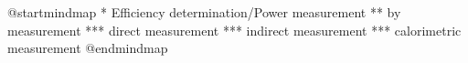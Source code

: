 \documentclass{scrartcl}
\begin{document}
\begin{plantuml}
@startmindmap
* Efficiency determination/\n Power measurement
** by measurement
*** direct measurement
*** indirect measurement
*** calorimetric measurement
@endmindmap
\end{plantuml}
\end{document}
